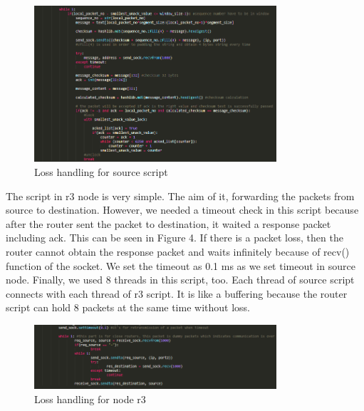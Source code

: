 \documentclass[conference]{IEEEtran}
\begin{document}
\begin{figure}[htp]
    \centering
    \includegraphics[width=9cm]{handle_loss.png}
    \caption{Loss handling for source script}
    \label{fig:graph}
\end{figure}

The script in r3 node is very simple. The aim of it, forwarding the packets from source to destination. However, we needed a timeout check in this script because after the router sent the packet to destination, it waited a response packet including ack. This can be seen in Figure 4. If there is a packet loss, then the router cannot obtain the response packet and waits infinitely because of recv() function of the socket. We set the timeout as 0.1 ms as we set timeout in source node. Finally, we used 8 threads in this script, too. Each thread of source script connects with each thread of r3 script. It is like a buffering because the router script can hold 8 packets at the same time without loss.\\

\begin{figure}[htp]
    \centering
    \includegraphics[width=9cm]{router_handle_loss.png}
    \caption{Loss handling for node r3}
    \label{fig:graph}
\end{figure}
\end{document}
